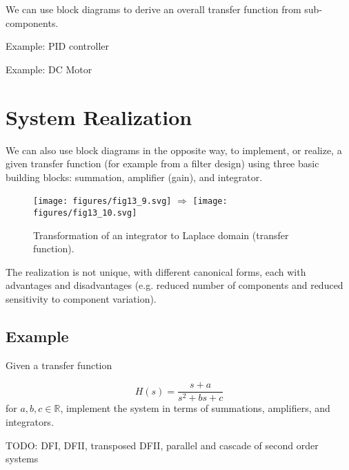\documentclass{article}
\begin{document}
We can use block diagrams to derive an overall transfer function from sub-components.

Example: PID controller

Example: DC Motor

\section{System Realization}

We can also use block diagrams in the opposite way, to implement, or realize, a given transfer function (for example from a filter design) using three basic building blocks: summation, amplifier (gain), and integrator.

\begin{figure}
  \centering
  \texttt{[image: figures/fig13\_9.svg]}
  $\Longrightarrow$
    \texttt{[image: figures/fig13\_10.svg]}
  \caption{Transformation of an integrator to Laplace domain (transfer function).}
\end{figure}

The realization is not unique, with different canonical forms, each with
advantages and disadvantages (e.g. reduced number of components and reduced sensitivity to component variation).

\subsection{Example}

Given a transfer function

\[
H(s) = \frac{s+a}{s^2 + bs + c}
\]
for $a,b,c\in\mathbb{R}$, implement the system in terms of summations, amplifiers, and integrators.

TODO: DFI, DFII, transposed DFII, parallel and cascade of second order systems
\end{document}
